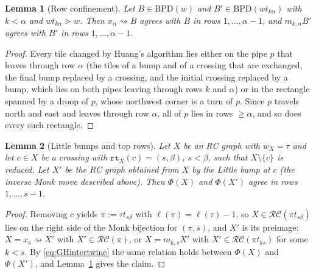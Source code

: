 \documentclass{amsart}
\newtheorem{lemma}{Lemma}[subsection]
\theoremstyle{definition}
\theoremstyle{remark}
\numberwithin{equation}{subsection}
\newcommand{\wof}[1]{w_{#1}}
\newcommand{\rtt}{\mathtt{rt}}
\newcommand{\RC}{\mathcal{RC}}
\begin{document}
\begin{lemma}[Row confinement]\label{lemma:bpdconfine}
Let $B\in\mathrm{BPD}(w)$ and $B'\in\mathrm{BPD}(wt_{k\alpha})$ with $k<\alpha$ and $wt_{k\alpha}\gtrdot w$. Then $x_\alpha\!\rightsquigarrow B$ agrees with $B$ in rows $1,\ldots,\alpha-1$, and $m_{k,\alpha}B'$ agrees with $B'$ in rows $1,\ldots,\alpha-1$.
\end{lemma}
\begin{proof}
Every tile changed by Huang's algorithm lies either on the pipe $p$ that leaves through row $\alpha$ (the tiles of a bump and of a crossing that are exchanged, the final bump replaced by a crossing, and the initial crossing replaced by a bump, which lies on both pipes leaving through rows $k$ and $\alpha$) or in the rectangle spanned by a droop of $p$, whose northwest corner is a turn of $p$. Since $p$ travels north and east and leaves through row $\alpha$, all of $p$ lies in rows $\geq\alpha$, and so does every such rectangle.
\end{proof}

\begin{lemma}[Little bumps and top rows]\label{lemma:bumpconfine}
Let $X$ be an RC graph with $\wof X=\tau$ and let $c\in X$ be a crossing with $\rtt_X(c)=(s,\beta)$, $s<\beta$, such that $X\setminus\{c\}$ is reduced. Let $X'$ be the RC graph obtained from $X$ by the Little bump at $c$ (the inverse Monk move described above). Then $\Phi(X)$ and $\Phi(X')$ agree in rows $1,\ldots,s-1$.
\end{lemma}
\begin{proof}
Removing $c$ yields $\pi:=\tau t_{s\beta}$ with $\ell(\pi)=\ell(\tau)-1$, so $X\in\RC(\pi t_{s\beta})$ lies on the right side of the Monk bijection for $(\pi,s)$, and $X'$ is its preimage: $X=x_s\!\rightsquigarrow X'$ with $X'\in\RC(\pi)$, or $X=m_{k,s}X'$ with $X'\in\RC(\pi t_{ks})$ for some $k<s$. By \eqref{eq:GHintertwine} the same relation holds between $\Phi(X)$ and $\Phi(X')$, and Lemma~\ref{lemma:bpdconfine} gives the claim.
\end{proof}
\end{document}
